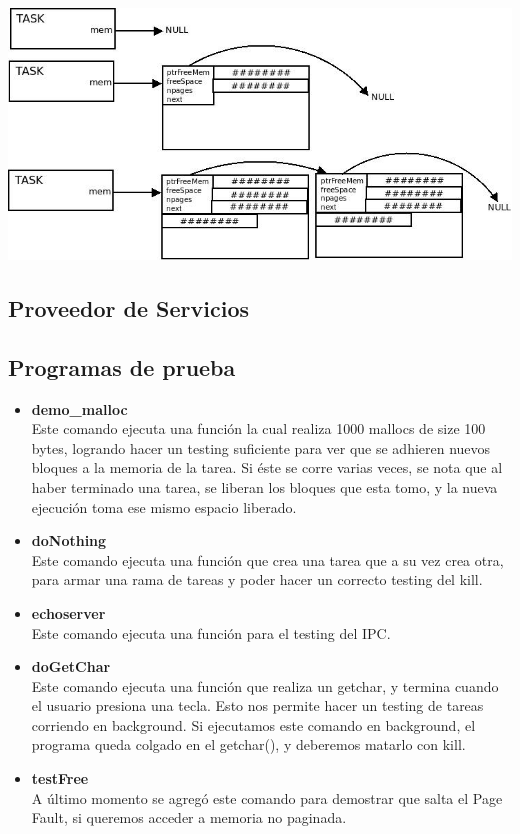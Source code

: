 \documentclass[a4paper,10pt]{article}
\begin{document}
\begin{center}
 \includegraphics[scale=0.45]{./malloc.jpeg}
\end{center}

\subsection{Proveedor de Servicios}

\subsection{Programas de prueba}
\begin{itemize}
 \item \textbf{demo\_malloc}\\
      \noindent Este comando ejecuta una función la cual realiza 1000 mallocs de size 100 bytes, logrando hacer un testing suficiente para ver
      que se adhieren nuevos bloques a la memoria de la tarea. Si éste se corre varias veces, se nota que al haber terminado una tarea, se liberan los
      bloques que esta tomo, y la nueva ejecución toma ese mismo espacio liberado.
 \item \textbf{doNothing}\\
      \noindent Este comando ejecuta una función que crea una tarea que a su vez crea otra, para armar una rama de tareas y poder hacer un correcto testing del
	kill.
 \item \textbf{echoserver}\\
      \noindent Este comando ejecuta una función para el testing del IPC.
 \item \textbf{doGetChar} \\
      \noindent Este comando ejecuta una función que realiza un getchar, y termina cuando el usuario presiona una tecla. Esto nos permite hacer un testing
	  de tareas corriendo en background. Si ejecutamos este comando en background, el programa queda colgado en el getchar(), y deberemos matarlo con
	  kill.
 \item \textbf{testFree}\\
      \noindent A último momento se agregó este comando para demostrar que salta el Page Fault, si queremos acceder a memoria no paginada.
\end{itemize}
\end{document}
